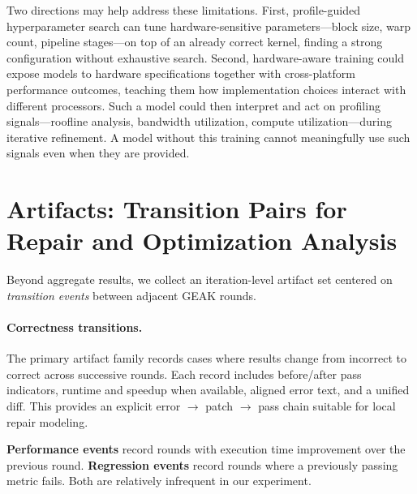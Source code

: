 Two directions may help address these limitations.
First, profile-guided hyperparameter search can tune hardware-sensitive parameters---block size, warp count, pipeline stages---on top of an already correct kernel, finding a strong configuration without exhaustive search. 
Second, hardware-aware training could expose models to hardware specifications together with cross-platform performance outcomes, teaching them how implementation choices interact with different processors. Such a model could then interpret and act on profiling signals---roofline analysis, bandwidth utilization, compute utilization---during iterative refinement. A model without this training cannot meaningfully use such signals even when they are provided.


\section{Artifacts: Transition Pairs for Repair and Optimization Analysis}
\label{app:artifacts}

Beyond aggregate results, we collect an iteration-level artifact 
set centered on \emph{transition events} between adjacent GEAK rounds.

\paragraph{Correctness transitions.}
The primary artifact family records cases where results change from incorrect to correct across successive rounds.
Each record includes before/after pass indicators, runtime and speedup when available, aligned error text, and a unified diff. This provides an explicit error $\rightarrow$ patch $\rightarrow$ pass chain suitable for local repair modeling.

\textbf{Performance events} record rounds with execution time improvement over the previous round. \textbf{Regression events} record rounds where a previously passing metric fails. Both are relatively infrequent in our experiment.